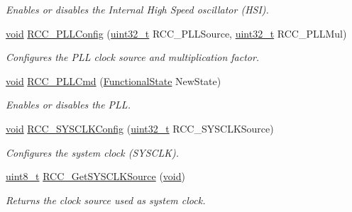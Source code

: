 \begin{DoxyCompactItemize}
\begin{DoxyCompactList}\small\item\em Enables or disables the Internal High Speed oscillator (H\+SI). \end{DoxyCompactList}\item 
\hyperlink{usb__devapi_8h_afabf60e7f57651d6d595a02c75f07cd0}{void} \hyperlink{group___r_c_c___private___functions_ga0f67634cbe721f2c42f022d2a93229c8}{R\+C\+C\+\_\+\+P\+L\+L\+Config} (\hyperlink{_p_e___types_8h_a33594304e786b158f3fb30289278f5af}{uint32\+\_\+t} R\+C\+C\+\_\+\+P\+L\+L\+Source, \hyperlink{_p_e___types_8h_a33594304e786b158f3fb30289278f5af}{uint32\+\_\+t} R\+C\+C\+\_\+\+P\+L\+L\+Mul)
\begin{DoxyCompactList}\small\item\em Configures the P\+LL clock source and multiplication factor. \end{DoxyCompactList}\item 
\hyperlink{usb__devapi_8h_afabf60e7f57651d6d595a02c75f07cd0}{void} \hyperlink{group___r_c_c___private___functions_ga84dee53c75e58fdb53571716593c2272}{R\+C\+C\+\_\+\+P\+L\+L\+Cmd} (\hyperlink{agilefox_2library_2inc_2stm32f10x__type_8h_ac9a7e9a35d2513ec15c3b537aaa4fba1}{Functional\+State} New\+State)
\begin{DoxyCompactList}\small\item\em Enables or disables the P\+LL. \end{DoxyCompactList}\item 
\hyperlink{usb__devapi_8h_afabf60e7f57651d6d595a02c75f07cd0}{void} \hyperlink{group___r_c_c___private___functions_ga3551a36a8f0a3dc96a74d6b939048337}{R\+C\+C\+\_\+\+S\+Y\+S\+C\+L\+K\+Config} (\hyperlink{_p_e___types_8h_a33594304e786b158f3fb30289278f5af}{uint32\+\_\+t} R\+C\+C\+\_\+\+S\+Y\+S\+C\+L\+K\+Source)
\begin{DoxyCompactList}\small\item\em Configures the system clock (S\+Y\+S\+C\+LK). \end{DoxyCompactList}\item 
\hyperlink{_p_e___types_8h_aba7bc1797add20fe3efdf37ced1182c5}{uint8\+\_\+t} \hyperlink{group___r_c_c___private___functions_gaaeb32311c208b2a980841c9c884a41ea}{R\+C\+C\+\_\+\+Get\+S\+Y\+S\+C\+L\+K\+Source} (\hyperlink{usb__devapi_8h_afabf60e7f57651d6d595a02c75f07cd0}{void})
\begin{DoxyCompactList}\small\item\em Returns the clock source used as system clock. \end{DoxyCompactList}\item 

\end{DoxyCompactItemize}
